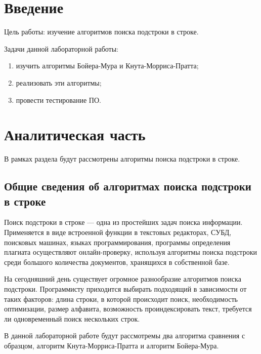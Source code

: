 \documentclass[a4paper,12pt]{report}
\begin{document}
	\setcounter{page}{2}
	\tableofcontents
    \chapter*{Введение}

        	Цель работы: изучение алгоритмов поиска подстроки в строке.
        	
        	Задачи данной лабораторной работы:
        	\begin{enumerate}
        		\item изучить алгоритмы Бойера-Мура и Кнута-Морриса-Пратта;
        		\item реализовать эти алгоритмы;
        		\item провести тестирование ПО.
        	\end{enumerate}
        \label{sec:intro}

    \newpage

    \chapter{Аналитическая часть}
        \label{sec:analitic_part}
        
        	В рамках раздела будут рассмотрены алгоритмы поиска подстроки в строке.
		
	\section{Общие сведения об алгоритмах поиска подстроки в строке}
        
			Поиск подстроки в строке — одна из простейших задач поиска информации. 
			Применяется в виде встроенной функции в текстовых редакторах, СУБД, поисковых машинах, языках программирования, программы определения плагиата осуществляют онлайн-проверку, используя алгоритмы поиска подстроки среди большого количества документов, хранящихся в собственной базе\cite{1}.
			
			На сегодняшний день существует огромное разнообразие алгоритмов поиска подстроки. 
			Программисту приходится выбирать подходящий в зависимости от таких факторов: длина строки, в которой происходит поиск, необходимость оптимизации, размер алфавита, возможность проиндексировать текст, требуется ли одновременный поиск нескольких строк. 
			
			В данной лабораторной работе будут рассмотремы два алгоритма сравнения с образцом, алгоритм Кнута-Морриса-Пратта и алгоритм Бойера-Мура.
\end{document}
